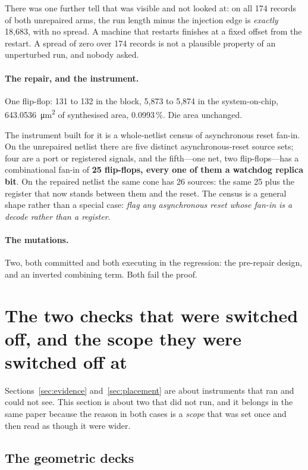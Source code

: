 \documentclass[11pt,a4paper]{article}
\begin{document}
There was one further tell that was visible and not looked at: on all 174
records of both unrepaired arms, the run length minus the injection edge
is \emph{exactly} 18{,}683, with no spread. A machine that restarts
finishes at a fixed offset from the restart. A spread of zero over 174
records is not a plausible property of an unperturbed run, and nobody
asked.

\paragraph{The repair, and the instrument.}
One flip-flop: 131 to 132 in the block, 5{,}873 to 5{,}874 in the
system-on-chip, \SI{643.0536}{\micro\meter\squared} of synthesised area,
\num{0.0993}\,\%. Die area unchanged.

The instrument built for it is a whole-netlist census of asynchronous
reset fan-in. On the unrepaired netlist there are five distinct
asynchronous-reset source sets; four are a port or registered signals,
and the fifth---one net, two flip-flops---has a combinational fan-in of
\textbf{25 flip-flops, every one of them a watchdog replica bit}. On the
repaired netlist the same cone has 26 sources: the same 25 plus the
register that now stands between them and the reset. The census is a
general shape rather than a special case: \emph{flag any asynchronous
reset whose fan-in is a decode rather than a register}.

\paragraph{The mutations.}
Two, both committed and both executing in the regression: the pre-repair
design, and an inverted combining term. Both fail the proof.

\section{The two checks that were switched off, and the scope they were
switched off at}
\label{sec:decks}

Sections~\ref{sec:evidence} and~\ref{sec:placement} are about instruments
that ran and could not see. This section is about two that did not run,
and it belongs in the same paper because the reason in both cases is a
\emph{scope} that was set once and then read as though it were wider.

\subsection{The geometric decks}
\end{document}
